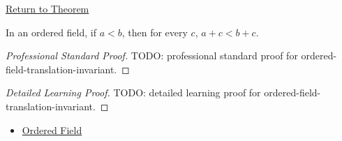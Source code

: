 \newpage
{}
\label{prf:ordered-field-translation-invariant}

\begin{remark*}[Return]
\hyperref[thm:ordered-field-translation-invariant]{Return to Theorem}
\end{remark*}

\begin{theorem*}
In an ordered field, if $a<b$, then for every $c$, $a+c<b+c$.
\end{theorem*}

\begin{proof}[Professional Standard Proof]
\LRAProofBodyStart
TODO: professional standard proof for ordered-field-translation-invariant.
\end{proof}

\begin{proof}[Detailed Learning Proof]
\LRAProofBodyStart
TODO: detailed learning proof for ordered-field-translation-invariant.
\end{proof}

\begin{remark*}
\end{remark*}

\begin{dependencies}
\begin{itemize}
  \item \hyperref[def:ordered-field]{Ordered Field}
\end{itemize}
\end{dependencies}

\clearpage
